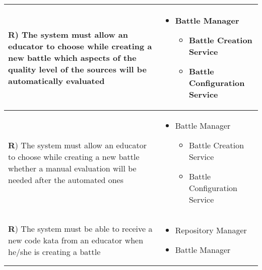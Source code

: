 \documentclass[../DD.tex]{subfiles}
\newcounter{rown}
\newcommand{\rowIndex}{\arabic{rown}\stepcounter{rown}}
\begin{document}
\begin{table}[h!]
\begin{center}
\begin{tabular}{|m{20em}|m{20em}|}
            \hline
            \textbf{R\rowIndex}) The system must allow an educator to choose while creating a new battle which aspects of the quality level of the sources will be automatically evaluated  & \begin{itemize}
                \item  Battle Manager
                \begin{itemize}
                    \item Battle Creation Service
                    \item Battle Configuration Service
                \end{itemize}
            \end{itemize}\\
            \hline
            \textbf{R\rowIndex}) The system must allow an educator to choose while creating a new battle whether a manual evaluation will be needed after the automated ones & \begin{itemize}
                \item  Battle Manager
                \begin{itemize}
                    \item Battle Creation Service
                    \item Battle Configuration Service
                \end{itemize}
            \end{itemize}\\
            \hline
            \textbf{R\rowIndex}) The system must be able to receive a new code kata from an educator when he/she is creating a battle & \begin{itemize}
                \item Repository Manager
                \item Battle Manager
            \end{itemize}\\
            \hline
            \end{tabular}
        \end{center}
    \end{table}
    \newpage
\end{document}
